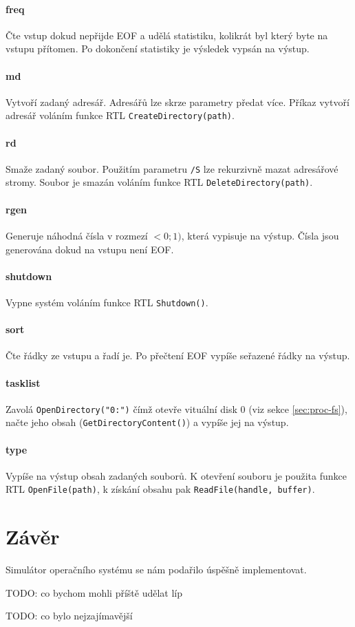 \documentclass[11pt,a4paper]{scrartcl}
\begin{document}
	
	\paragraph{freq}
	Čte vstup dokud nepřijde EOF a udělá statistiku, kolikrát byl který byte na vstupu přítomen. Po dokončení statistiky je výsledek vypsán na výstup. 
	
	\paragraph{md}
	Vytvoří zadaný adresář. Adresářů lze skrze parametry předat více. Příkaz vytvoří adresář voláním funkce RTL \verb|CreateDirectory(path)|.
	
	\paragraph{rd}
	Smaže zadaný soubor. Použitím parametru \verb|/S| lze rekurzivně mazat adresářové stromy. Soubor je smazán voláním funkce RTL \verb|DeleteDirectory(path)|.
	
	\paragraph{rgen}
	Generuje náhodná čísla v rozmezí $<0;1)$, která vypisuje na výstup. Čísla jsou generována dokud na vstupu není EOF.
	
	\paragraph{shutdown}
	Vypne systém voláním funkce RTL \verb|Shutdown()|.
	
	\paragraph{sort}
	Čte řádky ze vstupu a řadí je. Po přečtení EOF vypíše seřazené řádky na výstup.
	
	\paragraph{tasklist}
	Zavolá \verb|OpenDirectory("0:")| čímž otevře vituální disk 0 (viz sekce \ref{sec:proc-fs}), načte jeho obsah (\verb|GetDirectoryContent()|) a vypíše jej na výstup.
	
	\paragraph{type}
	Vypíše na výstup obsah zadaných souborů. K otevření souboru je použita funkce RTL \verb|OpenFile(path)|, k získání obsahu pak \verb|ReadFile(handle, buffer)|.
	
	\section{Závěr}
	Simulátor operačního systému se nám podařilo úspěšně implementovat. 
	
	TODO: co bychom mohli příště udělat líp 
	
	TODO: co bylo nejzajímavější
	
\end{document}
